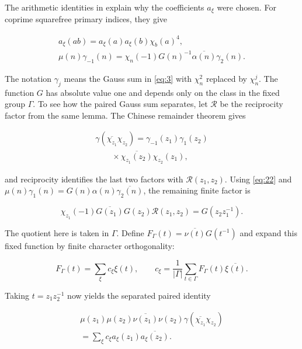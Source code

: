 \documentclass[reqno,a4paper,11pt]{amsart}
\begin{document}
The arithmetic identities in \cite[Lemma 4.1]{theta} explain why the coefficients $a_\xi$ were chosen. For coprime squarefree primary indices, they give

\begin{equation}\label{eq:22}
\begin{gathered}
a_\xi(ab)=a_\xi(a)a_\xi(b)\chi_b(a)^4, \\ \mu(n)\gamma_{-1}(n)=\chi_n(-1)G(n)^{-1}\overline{\alpha(n)}\gamma_2(n).
\end{gathered}
\end{equation}

The notation $\gamma_j$ means the Gauss sum in \eqref{eq:3} with $\chi_n^2$ replaced by $\chi_n^j$. The function $G$ has absolute value one and depends only on the class in the fixed group $\Gamma$. To see how the paired Gauss sum separates, let $\mathcal{R}$ be the reciprocity factor from the same lemma. The Chinese remainder theorem gives

\[
\begin{gathered}
\gamma(\overline{\chi_{z_1}}\chi_{z_2})=\gamma_{-1}(z_1)\gamma_1(z_2) \\ \qquad\times\overline{\chi_{z_1}(z_2)}\chi_{z_2}(z_1),
\end{gathered}
\]

and reciprocity identifies the last two factors with $\mathcal{R}(z_1,z_2)$. Using \eqref{eq:22} and $\mu(n)\gamma_1(n)=G(n)\alpha(n)\overline{\gamma_2(n)}$, the remaining finite factor is

\[
\chi_{z_1}(-1)\overline{G(z_1)}G(z_2)\mathcal{R}(z_1,z_2)=G(z_2z_1^{-1}).
\]

The quotient here is taken in $\Gamma$. Define $F_\Gamma(t)=\overline{\nu(t)}G(t^{-1})$ and expand this fixed function by finite character orthogonality:

\begin{equation}\label{eq:ray-expansion}
F_\Gamma(t)=\sum_\xi c_\xi\xi(t),\qquad c_\xi=\frac{1}{|\Gamma|}\sum_{t\in\Gamma}F_\Gamma(t)\overline{\xi(t)}.
\end{equation}

Taking $t=z_1z_2^{-1}$ now yields the separated paired identity

\begin{equation}\label{eq:paired-gauss}
\begin{gathered}
\mu(z_1)\mu(z_2)\overline{\nu(z_1)}\nu(z_2)\gamma(\overline{\chi_{z_1}}\chi_{z_2}) \\ =\sum_\xi c_\xi a_\xi(z_1)\overline{a_\xi(z_2)}.
\end{gathered}
\end{equation}
\end{document}

